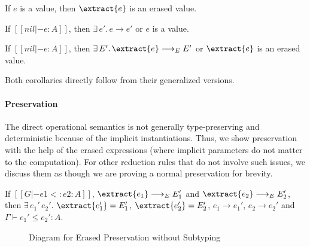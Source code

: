 \begin{lemma}
    If $e$ is a value, then $\extract{e}$ is an erased value.
\end{lemma}

\begin{corollary}[Progress]
    If $[[nil |- e : A]]$,
    then $\exists \, e'. \, e \longrightarrow e'$ or $e$ is a value.
\end{corollary}

\begin{corollary}
    If $[[nil |- e : A]]$,
    then $\exists \, E'. \, \extract{e} \longrightarrow_E E'$ or $\extract{e}$ is an erased value.
\end{corollary}

Both corollaries directly follow from their generalized versions.

\paragraph{Preservation}
The direct operational semantics is not generally type-preserving and
deterministic because of the implicit instantiations. Thus, we show
preservation with the help of the erased expressions (where implicit parameters
do not matter to the computation). For other reduction rules that do not involve
such issues, we discuss them as though we are proving a normal preservation
for brevity.

\begin{theorem}
    If $[[G |- e1 <: e2 : A]]$, $\extract{e_1} \longrightarrow_E E_1'$ and $\extract{e_2} \longrightarrow_E E_2'$,
    then $\exists\,e_1' \, e_2'.$ $\extract{e_1'} = E_1'$, $\extract{e_2'} = E_2'$,
    $e_1 \longrightarrow e_1'$, $e_2 \longrightarrow e_2'$ and $\Gamma \vdash e_1' \le e_2' : A$.
\end{theorem}

\begin{figure}
    \centering
    \caption{Diagram for Erased Preservation without Subtyping}
    \label{fig:preservation}
\end{figure}

